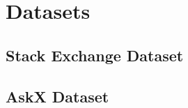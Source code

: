 \chapter{Datasets}%
\label{sec:datasets}

\section{Stack Exchange Dataset}%
\label{sec:datasets:stackex}


\section{AskX Dataset}%
\label{sec:datasets:askx}

